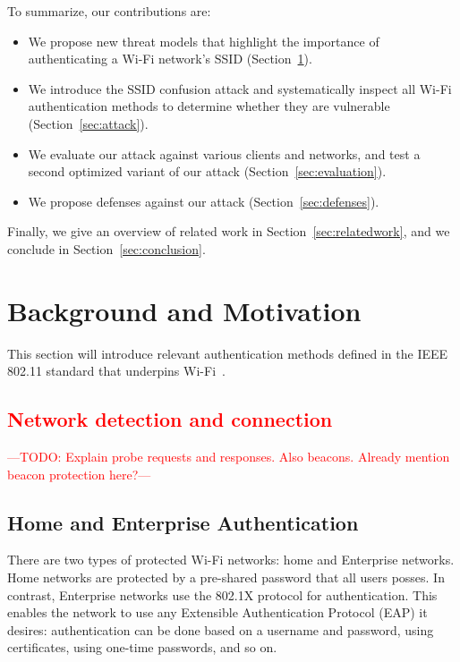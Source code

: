 \documentclass[sigconf,review,anonymous]{acmart}
\newcommand{\wifi}{\mbox{Wi-Fi}}
\DeclareRobustCommand{\red}[1]{\textcolor{red}{#1}}
\begin{document}
To summarize, our contributions are:
\begin{itemize}
	\item We propose new threat models that highlight the importance of authenticating a \wifi{} network's SSID (Section~\ref{sec:motivation}).

    \item We introduce the SSID confusion attack and systematically inspect all \wifi{} authentication methods to determine whether they are vulnerable (Section~\ref{sec:attack}).

    \item
    We evaluate our attack against various clients and networks, and test a second optimized variant of our attack (Section~\ref{sec:evaluation}).
	
	\item We propose %
	defenses against our attack (Section~\ref{sec:defenses}).
\end{itemize}
Finally, we give an overview of related work in Section~\ref{sec:relatedwork}, and we conclude in Section~\ref{sec:conclusion}.


\section{Background and Motivation}
\label{sec:motivation}

This section will introduce relevant authentication methods defined in the IEEE 802.11 standard that underpins \wifi{}~\cite{ieee80211-2020}.

\subsection{\red{Network detection and connection}}

\red{---TODO: Explain probe requests and responses. Also beacons. Already mention beacon protection here?---}

\subsection{Home and Enterprise Authentication}
There are two types of protected \wifi{} networks: home and Enterprise networks.
Home networks are protected by a pre-shared password that all users posses.
In contrast, Enterprise networks use the 802.1X protocol for authentication.
This enables the network to use any Extensible Authentication Protocol (EAP) it desires: authentication can be done based on a username and password, using certificates, using one-time passwords, and so on.
\end{document}
